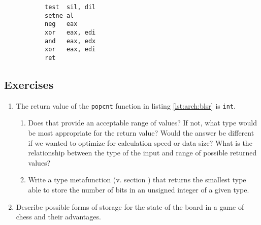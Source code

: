 \begin{figure}[ht]
    \centering
    \vspace{-\baselineskip}
    \begin{subfigure}[t]{0.5\textwidth}
        
    \end{subfigure}
    \hspace{2em}
    \begin{subfigure}[t]{0.2\textwidth}
        \begin{lstlisting}[style=x86]
test  sil, dil
setne al
neg   eax
xor   eax, edi
and   eax, edx
xor   eax, edi
ret
        \end{lstlisting}
    \end{subfigure}
    \vspace{-\baselineskip}
\end{figure}

\subsection{Exercises}

\begin{enumerate}[label*=\arabic*.]
    \item
        \label{ex:arch:width_type}
        The return value of the \texttt{popcnt} function in listing
        \ref{lst:arch:blsr} is \texttt{int}.
        \begin{enumerate}[label*=\arabic*.]
            \item
                \label{ex:arch:width_type:range}
                Does that provide an acceptable range of values?  If not, what
                type would be most appropriate for the return value?  Would the
                answer be different if we wanted to optimize for calculation
                speed or data size?  What is the relationship between the type
                of the input and range of possible returned values?
            \item
                \label{ex:arch:width_type:impl}
                Write a type metafunction (v. section )
                that returns the smallest type able to store the number of bits
                in an unsigned integer of a given type.
        \end{enumerate}
    \item
        \label{ex:arch:chess}
        Describe possible forms of storage for the state of the board in a game
        of chess and their advantages.
\end{enumerate}
